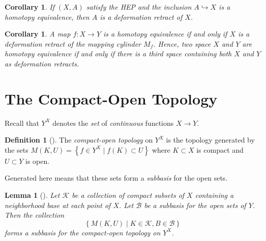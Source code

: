 \documentclass[reqno]{amsart}
\newtheorem{lemma}[theorem]{Lemma}
\newtheorem{corollary}[theorem]{Corollary}
\theoremstyle{definition}
\newtheorem{definition}[theorem]{Definition}
\theoremstyle{remark}
\begin{document}
\begin{corollary}
    If $\left( X,A \right) $ satisfy the HEP and the
    inclusion $A \hookrightarrow X$ is a homotopy equivalence,
    then $A$ is a deformation retract of $X$.
\end{corollary}

\begin{corollary}
    A map $f \colon X \to Y$ is a homotopy equivalence
    if and only if $X$ is a deformation retract of the
    mapping cylinder $M_f$. Hence, two space $X$ and 
    $Y$ are homotopy equivalence if and only if
    there is a third space containing both $X$ and
    $Y$ as deformation retracts.
\end{corollary}

\newpage



\section{The Compact-Open Topology}

Recall that $Y^{X}$ denotes the \textit{set} of 
\textit{continuous} functions $X \to Y$.

\begin{definition}[]
    The \textit{compact-open topology} on $Y^{X}$ is the
    topology generated by the sets
    $M \left( K, U \right) 
    = \left\{ f \in Y^{X} \mid 
    f(K) \subset U \right\} $ where
    $K \subset X$ is compact and
    $U \subset Y$ is open.
\end{definition}
Generated here means that these sets form
a \textit{subbasis} for the open sets.\\


\begin{lemma}[]\label{Lemma:Compact-Open-Subbasis}
    Let $\mathcal{K}$ be a collection of compact subsets
    of $X$ containing a neighborhood base
    at each point of $X$. Let
    $\mathcal{B}$ be a subbasis for the open sets
    of $Y$. Then
    the collection
     \[
    \left\{ M\left( K,U \right)  \mid 
    K \in \mathcal{K}, B \in \mathcal{B} \right\} 
    \] 
    forms a subbasis for the compact-open topology
    on $Y^{X}$.
\end{lemma}
\end{document}
